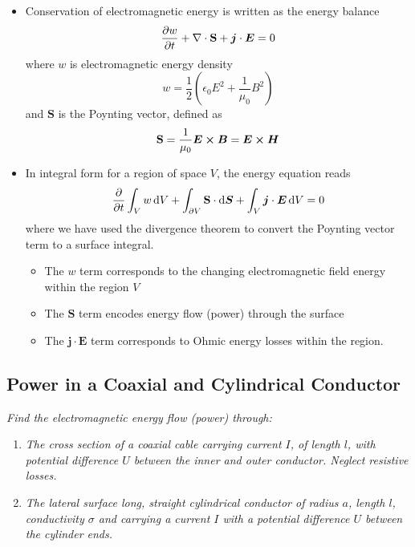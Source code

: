 \documentclass[11pt, a4paper]{article}
\newcommand{\diff}{\mathop{}\!\mathrm{d}} %
\renewcommand{\vec}[1]{\bm{#1}} %
\newcommand{\E}{\vec{E}}  %
\newcommand{\B}{\vec{B}}  %
\renewcommand{\H}{\vec{H}}  %
\renewcommand{\S}{\mathbf{S}}  %
\newcommand{\ee}{\epsilon_{0}}  %
\newcommand{\mm}{\mu_{0}}  %
\newcommand{\m}{\vec{m}}  %
\newcommand{\Poy}{Poynting\xspace}
\renewcommand{\div}{\nabla \cdot}
\begin{document}
\begin{itemize}
	\item Conservation of electromagnetic energy is written as the energy balance
	\begin{equation*}
		\pdv{w}{t} + \div \S + \vec{j}\cdot \E = 0
	\end{equation*}
	where $ w $ is electromagnetic energy density
	\begin{equation*}
		w = \frac{1}{2}\left(\ee E^{2} + \frac{1}{\mm}B^{2}\right)
	\end{equation*}
	and $ \S $ is the \Poy vector, defined as
	\begin{equation*}
		\S = \frac{1}{\mm}\E \cross \B = \E \cross \H
	\end{equation*}
	
	\item In integral form for a region of space $ V $, the energy equation reads
	\begin{equation*}
		\pdv{t}\int_{V}w \diff V + \int_{\partial V} \S \cdot  \diff \vec{S} + \int_{V} \vec{j}\cdot \E \diff V = 0
	\end{equation*}
	where we have used the divergence theorem to convert the Poynting vector term to a surface integral.
	\begin{itemize}
		\item The $ w $ term corresponds to the changing electromagnetic field energy within the region $ V $
		
		\item The $ \S $ term encodes energy flow (power) through the surface
		
		\item The $ \vec{j} \cdot \E $ term corresponds to Ohmic energy losses within the region.
	\end{itemize}
	
\end{itemize}

\subsection{Power in a Coaxial and Cylindrical Conductor}
\textit{Find the electromagnetic energy flow (power) through:}
\begin{enumerate}
	\item \textit{The cross section of a coaxial cable carrying current $ I $, of length $ l $, with potential difference $ U $ between the inner and outer conductor. Neglect resistive losses.}
	
	\item \textit{The lateral surface long, straight cylindrical conductor of radius $ a $, length $ l $, conductivity $ \sigma $ and carrying a current $ I $ with a potential difference $ U $ between the cylinder ends.}
\end{enumerate}
\end{document}
